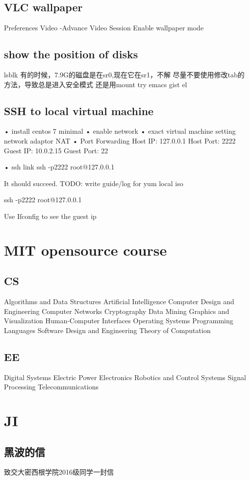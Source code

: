 \documentclass[11pt]{article}
\begin{document}
\subsection{VLC wallpaper}
\label{sec:org4188414}
Preferences
Video -Advance
Video Session
Enable wallpaper mode
\subsection{show the position of disks}
\label{sec:org91602c5}
lsblk
有的时候，7.9G的磁盘是在sr0,现在它在sr1，不解
尽量不要使用修改tab的方法，导致总是进入安全模式
还是用mount
try emacs gist el
\subsection{SSH to local virtual machine}
\label{sec:orgc8d2080}
• install centos 7 minimal
• enable network
• exact virtual machine setting network adaptor NAT
• Port Forwarding
Host IP:    127.0.0.1
Host Port:  2222
Guest IP:   10.0.2.15
Guest Port: 22

• ssh link
ssh -p2222 root@127.0.0.1

It should succeed.
TODO:
write guide/log for yum local iso

ssh -p2222 root@127.0.0.1

Use
Ifconfig to see the guest ip
\section{MIT opensource course}
\label{sec:org4199d9e}
\subsection{CS}
\label{sec:org537247c}
Algorithms and Data Structures
Artificial Intelligence
Computer Design and Engineering
Computer Networks
Cryptography
Data Mining
Graphics and Visualization
Human-Computer Interfaces
Operating Systems
Programming Languages
Software Design and Engineering
Theory of Computation
\subsection{EE}
\label{sec:org3e4bbb2}
Digital Systems
Electric Power
Electronics
Robotics and Control Systems
Signal Processing
Telecommunications
\section{JI}
\label{sec:orgb5a2d77}
\subsection{黑波的信}
\label{sec:orgffdfdd7}
致交大密西根学院2016级同学一封信
\end{document}
